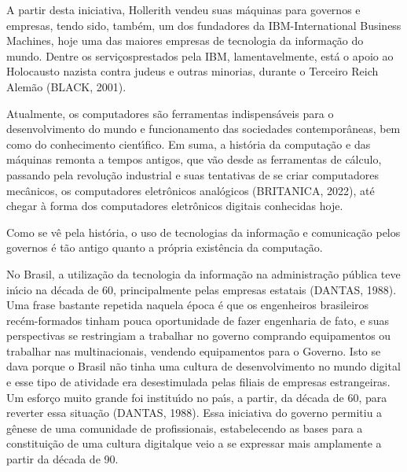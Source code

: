 \documentclass[
12pt,		%
openright,	%
twoside,  %
a4paper,			%
chapter=TITLE,		%
english,			%
french,				%
spanish,			%
brazil				%
]{USPSC-classe/USPSC}
\begin{document}
A partir desta iniciativa, Hollerith vendeu suas m\'aquinas para governos e empresas, tendo sido, tamb\'em, um dos fundadores da IBM-International Business Machines, hoje uma das maiores empresas de tecnologia da informa\c{c}\~ao do mundo. Dentre os \textquotedbl servi\c{c}os\textquotedbl  prestados pela IBM, lamentavelmente, est\'a o apoio ao Holocausto nazista contra judeus e outras minorias, durante o Terceiro Reich Alem\~ao (BLACK, 2001).









Atualmente, os computadores s\~ao ferramentas indispens\'aveis para o desenvolvimento do mundo e funcionamento das sociedades contempor\^aneas, bem como do conhecimento cient\'{\i}fico. Em suma, a hist\'oria da computa\c{c}\~ao e das m\'aquinas remonta a tempos antigos, que v\~ao desde as ferramentas de c\'alculo, passando pela revolu\c{c}\~ao industrial e suas tentativas de se criar computadores mec\^anicos, os computadores eletr\^onicos anal\'ogicos  (BRITANICA, 2022), at\'e chegar \`a forma dos computadores eletr\^onicos digitais conhecidas hoje.









Como se v\^e pela hist\'oria, o uso de tecnologias da informa\c{c}\~ao e comunica\c{c}\~ao pelos governos \'e t\~ao antigo quanto a pr\'opria exist\^encia da computa\c{c}\~ao.









No Brasil, a utiliza\c{c}\~ao da tecnologia da informa\c{c}\~ao na administra\c{c}\~ao p\'ublica teve in\'{\i}cio na d\'ecada de 60, principalmente pelas empresas estatais (DANTAS, 1988). Uma frase bastante repetida naquela \'epoca \'e que os engenheiros brasileiros rec\'em-formados tinham pouca oportunidade de fazer engenharia de fato, e suas perspectivas se restringiam a trabalhar no governo comprando equipamentos ou trabalhar nas multinacionais, vendendo equipamentos para o Governo. Isto se dava porque o Brasil n\~ao tinha uma cultura de desenvolvimento no mundo digital e esse tipo de atividade era desestimulada pelas filiais de empresas estrangeiras. Um esfor\c{c}o muito grande foi institu\'{\i}do no pa\'{\i}s, a partir, da d\'ecada de 60, para reverter essa situa\c{c}\~ao (DANTAS, 1988). Essa iniciativa do governo permitiu a g\^enese de uma comunidade de profissionais, estabelecendo as bases para a constitui\c{c}\~ao de uma \textquotedbl  cultura digital\textquotedbl  que veio a se expressar mais amplamente a partir da d\'ecada de 90.
\end{document}

